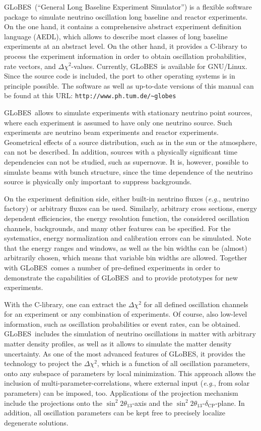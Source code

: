 \documentclass[a4paper,12pt,twoside]{book}
\newcommand{\deltacp}{\delta_{\mathrm{CP}}}
\newcommand{\stheta}{\sin^2 2 \theta_{13}}
\newcommand{\eg}{{\it e.g.}}
\newcommand{\GLOBES}{{\sf GLoBES}}
\begin{document}
\vspace*{-4ex}
\GLOBES\ (``General Long Baseline Experiment Simulator'') is a flexible
software package to simulate neutrino oscillation 
long baseline and reactor experiments. On the
one hand, it contains a comprehensive abstract experiment definition
language (AEDL), which allows to describe most classes 
of long baseline experiments
at an abstract level. On the other hand, it provides a C-library to
process the experiment information in order to obtain oscillation
probabilities, rate vectors, and $\Delta \chi^2$-values. Currently, 
\GLOBES\ is available for GNU/Linux. Since the source code is included,
the port to other operating systems is in principle possible. The software
as well as up-to-date versions of this manual can be found at this URL:
 \verb+http://www.ph.tum.de/~globes+

\GLOBES\ allows to simulate experiments with stationary neutrino point sources, where each experiment is assumed to have only one neutrino source.
Such experiments are neutrino beam experiments and reactor experiments. 
Geometrical effects of a source distribution, such as in the sun or the 
atmosphere, can not be described. In addition, sources with a physically 
significant time dependencies  can not be studied, such as  supernov\ae. It 
is, however, possible to simulate beams with bunch structure, since the 
time dependence of the neutrino source is physically only important to suppress backgrounds. 

On the experiment definition side, either built-in neutrino fluxes
(\eg, neutrino factory) or arbitrary fluxes can be used. Similarly,
arbitrary cross sections, energy dependent efficiencies, the
energy resolution function, the considered oscillation channels, 
backgrounds, and many other features can be specified. 
For the systematics, energy
normalization and calibration errors can be simulated. Note that
the energy ranges and windows, as well as the bin widths can be
(almost) arbitrarily chosen, which means that variable bin
widths are allowed. Together with \GLOBES\ comes a number of
pre-defined experiments in order to demonstrate the capabilities
of \GLOBES\ and to provide prototypes for new experiments.

With the C-library, one can extract the $\Delta \chi^2$ for all defined 
oscillation channels for an experiment or any combination of experiments.
Of course, also low-level information, such as oscillation
probabilities or event rates, can be obtained. \GLOBES\ includes the
simulation of neutrino oscillations in matter with arbitrary matter 
density profiles, as well as it allows to simulate the matter density
uncertainty. As one of the most
advanced features of \GLOBES , it provides the technology to 
project the $\Delta \chi^2$, which is a function of all oscillation
parameters, onto any subspace of parameters by local minimization. 
This approach allows the inclusion of multi-parameter-correlations,
where external input (\eg, from solar parameters) can be imposed, too.
Applications of the projection mechanism include the projections onto the $\stheta$-axis and the $\stheta$-$\deltacp$-plane. In addition, all oscillation parameters can be kept free to precisely localize 
degenerate solutions.
\end{document}

